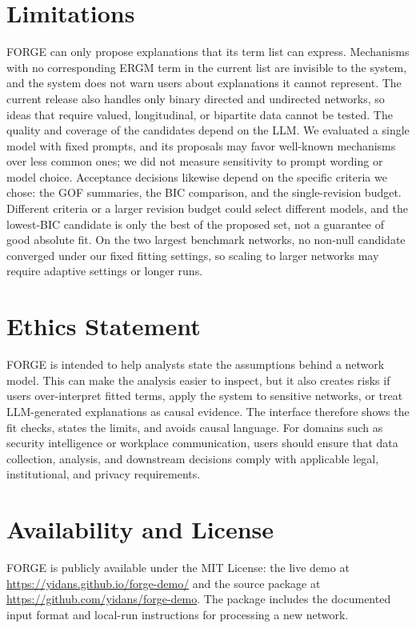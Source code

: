 \documentclass[11pt]{article}
\begin{document}
\section*{Limitations}
\label{sec:limitations}
FORGE can only propose explanations that its term list can express. Mechanisms with no corresponding ERGM term in the current list are invisible to the system, and the system does not warn users about explanations it cannot represent. The current release also handles only binary directed and undirected networks, so ideas that require valued, longitudinal, or bipartite data cannot be tested. The quality and coverage of the candidates depend on the LLM. We evaluated a single model with fixed prompts, and its proposals may favor well-known mechanisms over less common ones; we did not measure sensitivity to prompt wording or model choice. Acceptance decisions likewise depend on the specific criteria we chose: the GOF summaries, the BIC comparison, and the single-revision budget. Different criteria or a larger revision budget could select different models, and the lowest-BIC candidate is only the best of the proposed set, not a guarantee of good absolute fit. On the two largest benchmark networks, no non-null candidate converged under our fixed fitting settings, so scaling to larger networks may require adaptive settings or longer runs. 

\section*{Ethics Statement}
\label{sec:ethics}

FORGE is intended to help analysts state the assumptions behind a network model. This can make the analysis easier to inspect, but it also creates risks if users over-interpret fitted terms, apply the system to sensitive networks, or treat LLM-generated explanations as causal evidence. The interface therefore shows the fit checks, states the limits, and avoids causal language. For domains such as security intelligence or workplace communication, users should ensure that data collection, analysis, and downstream decisions comply with applicable legal, institutional, and privacy requirements.


\section*{Availability and License}
\label{sec:availability}

FORGE is publicly available under the MIT License: the live demo at \url{https://yidans.github.io/forge-demo/} and the source package at \url{https://github.com/yidans/forge-demo}. The package includes the documented input format and local-run instructions for processing a new network.
\end{document}
